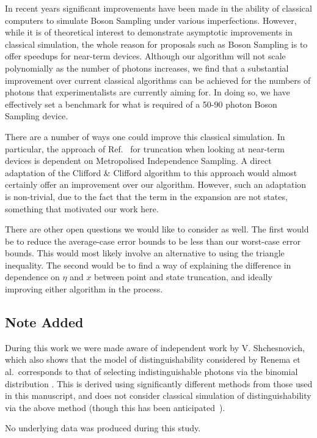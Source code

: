 In recent years significant improvements have been made in the ability of classical computers to simulate Boson Sampling under various imperfections. 
However, while it is of theoretical interest to demonstrate asymptotic improvements in classical simulation, the whole reason for proposals such as Boson Sampling is to offer speedups for near-term devices. 
Although our algorithm will not scale polynomially as the number of photons increases, we find that a substantial improvement over current classical algorithms can be achieved for the numbers of photons that experimentalists are currently aiming for. 
In doing so, we have effectively set a benchmark for what is required of a 50-90 photon Boson Sampling device.

There are a number of ways one could improve this classical simulation. 
In particular, the approach of Ref.~\cite{renema2018} for truncation when looking at near-term devices is dependent on Metropolised Independence Sampling. 
A direct adaptation of the Clifford \& Clifford algorithm to this approach would almost certainly offer an improvement over our algorithm. 
However, such an adaptation is non-trivial, due to the fact that the term in the expansion are not states, something that motivated our work here.

There are other open questions we would like to consider as well. The first would be to reduce the average-case error bounds to be less than our worst-case error bounds. This would most likely involve an alternative to using the triangle inequality. The second would be to find a way of explaining the difference in dependence on $\eta$ and $x$ between point and state truncation, and ideally improving either algorithm in the process.


\subsection{Note Added}

During this work we were made aware of independent work by V. Shchesnovich, which also shows that the model of distinguishability considered by Renema et al.\ corresponds to that of selecting indistinguishable photons via the binomial distribution \cite{shchesnovich2019}. 
This is derived using significantly different methods from those used in this manuscript, and does not consider classical simulation of distinguishability via the above method (though this has been anticipated~\cite{shchesnovich2019clifford}).

No underlying data was produced during this study.